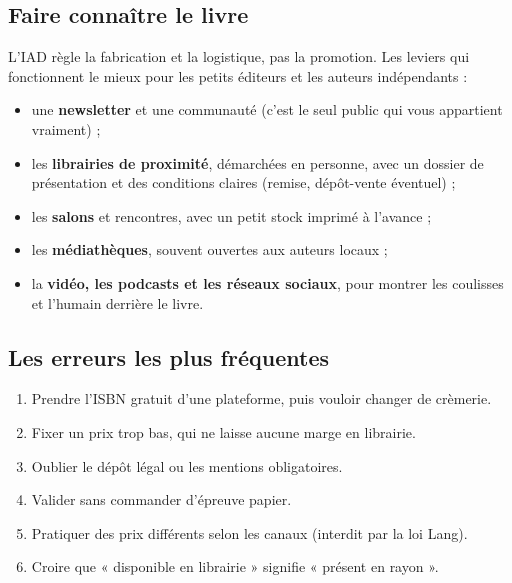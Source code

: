 \subsection{Faire connaître le livre}

L’IAD règle la fabrication et la logistique, pas la promotion. Les leviers
qui fonctionnent le mieux pour les petits éditeurs et les auteurs
indépendants :

\begin{itemize}
  \item une \textbf{newsletter} et une communauté (c’est le seul public
        qui vous appartient vraiment) ;
  \item les \textbf{librairies de proximité}, démarchées en personne,
        avec un dossier de présentation et des conditions claires
        (remise, dépôt-vente éventuel) ;
  \item les \textbf{salons} et rencontres, avec un petit stock imprimé
        à l’avance ;
  \item les \textbf{médiathèques}, souvent ouvertes aux auteurs locaux ;
  \item la \textbf{vidéo, les podcasts et les réseaux sociaux}, pour
        montrer les coulisses et l’humain derrière le livre.
\end{itemize}

\subsection{Les erreurs les plus fréquentes}

\begin{enumerate}
  \item Prendre l’ISBN gratuit d’une plateforme, puis vouloir changer de
        crèmerie.
  \item Fixer un prix trop bas, qui ne laisse aucune marge en librairie.
  \item Oublier le dépôt légal ou les mentions obligatoires.
  \item Valider sans commander d’épreuve papier.
  \item Pratiquer des prix différents selon les canaux (interdit par la
        loi Lang).
  \item Croire que « disponible en librairie » signifie « présent en
        rayon ».
\end{enumerate}
